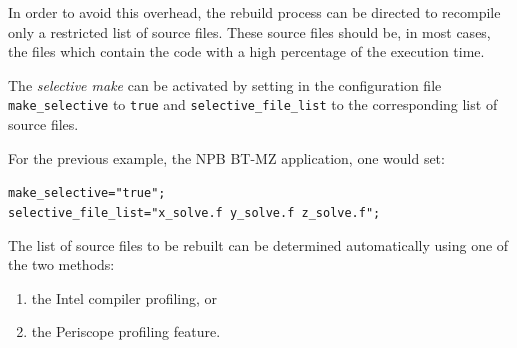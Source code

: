 \documentclass[11pt,a4paper, oneside]{book} %
\begin{document}
In order to avoid this overhead, the rebuild process can be directed to recompile only a restricted list of source files. These source files should be, in most cases, the files which contain the code with a high percentage of the execution time.

The \textit{selective make} can be activated by setting in the configuration file \texttt{make\_selective} to \texttt{true} and \texttt{selective\_file\_list} to the corresponding list of source files.

For the previous example, the NPB BT-MZ application, one would set:

\begin{center}
\begin{minipage}{0.8\textwidth}
\texttt{make\_selective="true";\\
selective\_file\_list="x\_solve.f y\_solve.f z\_solve.f";}
\end{minipage}
\end{center}

The list of source files to be rebuilt can be determined automatically using one of the two methods:

\begin{enumerate}
	\item the Intel compiler profiling, or
	\item the Periscope profiling feature.
\end{enumerate}
\end{document}
